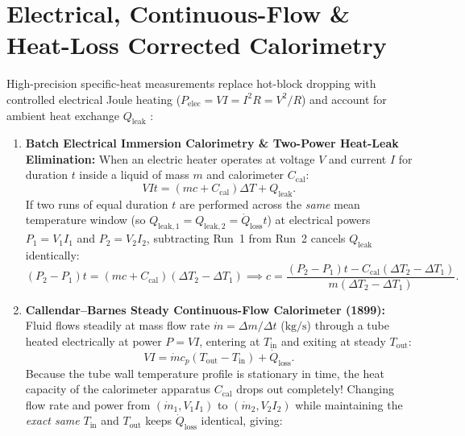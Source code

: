 \section{Electrical, Continuous-Flow \& Heat-Loss Corrected Calorimetry}
\label{sec:04.4}

High-precision specific-heat measurements replace hot-block dropping with controlled electrical Joule heating ($P_{\mathrm{elec}} = VI = I^2R = V^2/R$) and account for ambient heat exchange $Q_{\mathrm{leak}}$ :

\begin{enumerate}
  \item \textbf{Batch Electrical Immersion Calorimetry \& Two-Power Heat-Leak Elimination:}
  When an electric heater operates at voltage $V$ and current $I$ for duration $t$ inside a liquid of mass $m$ and calorimeter $C_{\mathrm{cal}}$:
  \begin{equation}\label{eq:04:elec}
    V I t = (m c + C_{\mathrm{cal}})\Delta T + Q_{\mathrm{leak}}.
  \end{equation}
  If two runs of equal duration $t$ are performed across the \emph{same} mean temperature window (so $Q_{\mathrm{leak},1} = Q_{\mathrm{leak},2} = \dot{Q}_{\mathrm{loss}}t$) at electrical powers $P_1 = V_1 I_1$ and $P_2 = V_2 I_2$, subtracting Run~1 from Run~2 cancels $Q_{\mathrm{leak}}$ identically:
  \begin{equation}\label{eq:04:tworun}
    (P_2 - P_1)t = (m c + C_{\mathrm{cal}})(\Delta T_2 - \Delta T_1) \implies
    c = \frac{(P_2 - P_1)t - C_{\mathrm{cal}}(\Delta T_2 - \Delta T_1)}{m(\Delta T_2 - \Delta T_1)}.
  \end{equation}
  \item \textbf{Callendar--Barnes Steady Continuous-Flow Calorimeter (1899):}
  Fluid flows steadily at mass flow rate $\dot{m} = \Delta m/\Delta t$ ($\si{\kilogram\per\second}$) through a tube heated electrically at power $P = VI$, entering at $T_{\mathrm{in}}$ and exiting at steady $T_{\mathrm{out}}$:
  \begin{equation}\label{eq:04:flow}
    V I = \dot{m} c_p (T_{\mathrm{out}} - T_{\mathrm{in}}) + \dot{Q}_{\mathrm{loss}}.
  \end{equation}
  Because the tube wall temperature profile is stationary in time, the heat capacity of the calorimeter apparatus $C_{\mathrm{cal}}$ drops out completely! Changing flow rate and power from $(\dot{m}_1, V_1 I_1)$ to $(\dot{m}_2, V_2 I_2)$ while maintaining the \emph{exact same} $T_{\mathrm{in}}$ and $T_{\mathrm{out}}$ keeps $\dot{Q}_{\mathrm{loss}}$ identical, giving:

\end{enumerate}
